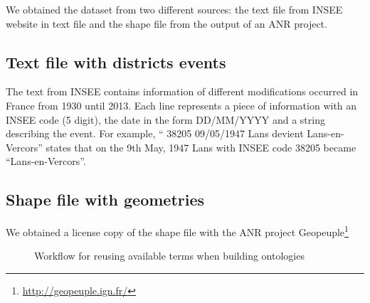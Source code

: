

We obtained the dataset from two different sources: the text file from INSEE website in text file and the shape file from the output of an ANR project. 

\subsection{Text file with districts events}
The text from INSEE contains information of different modifications occurred in France from 1930 until 2013. Each line represents a piece of information with an INSEE code (5 digit), the date in the form DD/MM/YYYY and a string describing the event. For example, `` 38205	09/05/1947	Lans devient Lans-en-Vercors'' states that on the 9th May, 1947 Lans with INSEE code 38205 became ``Lans-en-Vercors''. 


\subsection{Shape file with geometries}
We obtained a license copy of the shape file with the ANR project Geopeuple\footnote{\url{http://geopeuple.ign.fr/}}


\begin{figure}
\centering
\caption{Workflow for reusing available terms when building ontologies}
\label{fig:workflow}
\end{figure}


